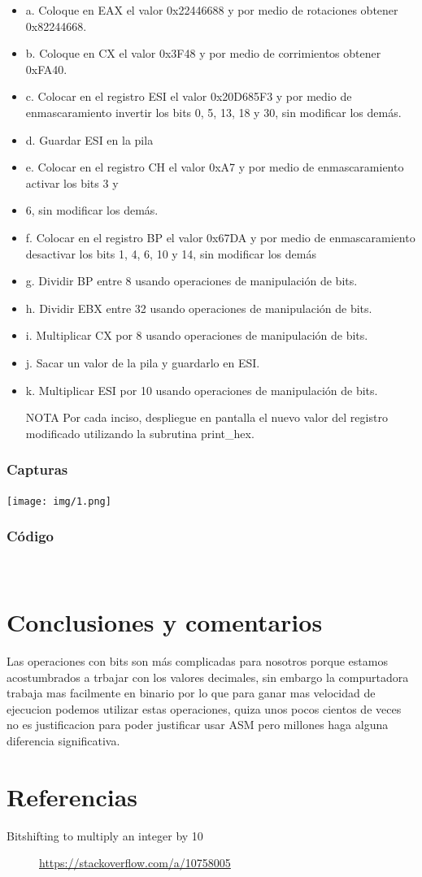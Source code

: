 \documentclass[12pt]{article}
\begin{document}
\begin{itemize}
\item a. Coloque en EAX el valor 0x22446688 y por medio de rotaciones obtener 0x82244668.
\item b. Coloque en CX el valor 0x3F48 y por medio de corrimientos obtener 0xFA40.
\item c. Colocar en el registro ESI el valor 0x20D685F3 y por medio de enmascaramiento invertir los bits 0, 5, 13, 18 y 30, sin modificar los demás.
\item d. Guardar ESI en la pila
\item e. Colocar en el registro CH el valor 0xA7 y por medio de enmascaramiento activar los bits 3 y
\item 6, sin modificar los demás.
\item f. Colocar en el registro BP el valor 0x67DA y por medio de enmascaramiento desactivar los bits 1, 4, 6, 10 y 14, sin modificar los demás
\item g. Dividir BP entre 8 usando operaciones de manipulación de bits.
\item h. Dividir EBX entre 32 usando operaciones de manipulación de bits.
\item i. Multiplicar CX por 8 usando operaciones de manipulación de bits.
\item j. Sacar un valor de la pila y guardarlo en ESI.
\item k. Multiplicar ESI por 10 usando operaciones de manipulación de bits.

\item[{NOTA}] Por cada inciso, despliegue en pantalla el nuevo valor del registro modificado utilizando la subrutina print\_hex.
\end{itemize}

\subsubsection*{Capturas}
\label{sec:orgee8ba5d}
\begin{center}
\texttt{[image: img/1.png]}
\end{center}

\subsubsection*{Código}
\label{sec:org8e98765}
\\ 

\section*{Conclusiones y comentarios}
\label{sec:org4772033}
Las operaciones con bits son más complicadas para nosotros porque estamos acostumbrados a trbajar 
con los valores decimales, sin embargo la compurtadora trabaja mas facilmente en binario por lo que 
para ganar mas velocidad de ejecucion podemos utilizar estas operaciones, quiza unos pocos 
cientos de veces no es justificacion para poder justificar usar ASM pero millones haga alguna 
diferencia significativa.


\section*{Referencias}
\label{sec:orgfb7582d}
\begin{description}
\item[{Bitshifting to multiply an integer by 10}] \url{https://stackoverflow.com/a/10758005}
\end{description}
\end{document}
